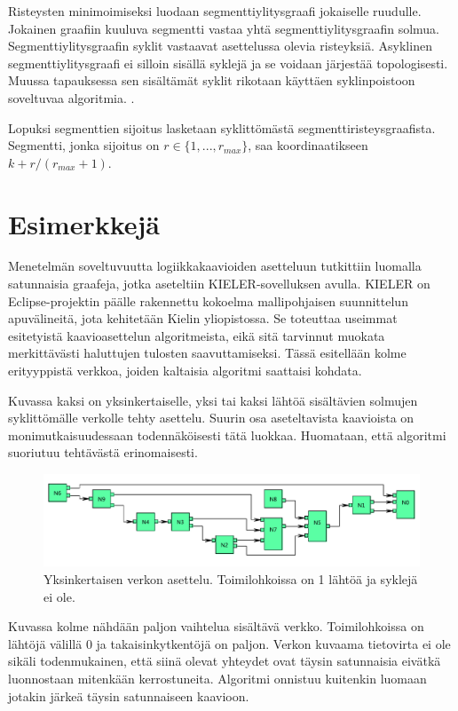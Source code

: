 \documentclass[finnish,12pt]{article}
\begin{document}
Risteysten minimoimiseksi luodaan segmenttiylitysgraafi jokaiselle ruudulle.
Jokainen graafiin kuuluva segmentti vastaa yhtä segmenttiylitysgraafin solmua.
Segmenttiylitysgraafin syklit vastaavat asettelussa olevia risteyksiä.
Asyklinen segmenttiylitysgraafi ei silloin sisällä syklejä ja se voidaan järjestää topologisesti.
Muussa tapauksessa sen sisältämät syklit rikotaan käyttäen syklinpoistoon soveltuvaa algoritmia. \cite{RefWorks:48}.

Lopuksi segmenttien sijoitus lasketaan syklittömästä segmenttiristeysgraafista.
Segmentti, jonka sijoitus on $r \in \{1,...,r_{max}\}$, saa koordinaatikseen $k + r/(r_{max} +1)$.

	\clearpage
	\section{Esimerkkejä}
	
Menetelmän soveltuvuutta logiikkakaavioiden asetteluun tutkittiin luomalla satunnaisia graafeja, jotka aseteltiin KIELER-sovelluksen avulla.
KIELER on Eclipse-projektin päälle rakennettu kokoelma mallipohjaisen suunnittelun apuvälineitä, jota kehitetään Kielin yliopistossa. \cite{RefWorks:123}
Se toteuttaa useimmat esitetyistä kaavioasettelun algoritmeista, eikä sitä tarvinnut muokata merkittävästi haluttujen tulosten saavuttamiseksi.
Tässä esitellään kolme erityyppistä verkkoa, joiden kaltaisia algoritmi saattaisi kohdata.

Kuvassa kaksi on yksinkertaiselle, yksi tai kaksi lähtöä sisältävien solmujen syklittömälle verkolle tehty asettelu.
Suurin osa aseteltavista kaavioista on monimutkaisuudessaan todennäköisesti tätä luokkaa. Huomataan, että algoritmi suoriutuu tehtävästä erinomaisesti.

\begin{figure}[ht]
	\includegraphics[width=\textwidth]{esim1.pdf}
	\caption{Yksinkertaisen verkon asettelu. Toimilohkoissa on 1 lähtöä ja syklejä ei ole.}
\end{figure}

Kuvassa kolme nähdään paljon vaihtelua sisältävä verkko.
Toimilohkoissa on lähtöjä välillä 0 ja takaisinkytkentöjä on paljon.
Verkon kuvaama tietovirta ei ole sikäli todenmukainen, että siinä olevat yhteydet ovat täysin satunnaisia eivätkä luonnostaan mitenkään kerrostuneita.
Algoritmi onnistuu kuitenkin luomaan jotakin järkeä täysin satunnaiseen kaavioon.
\end{document}
